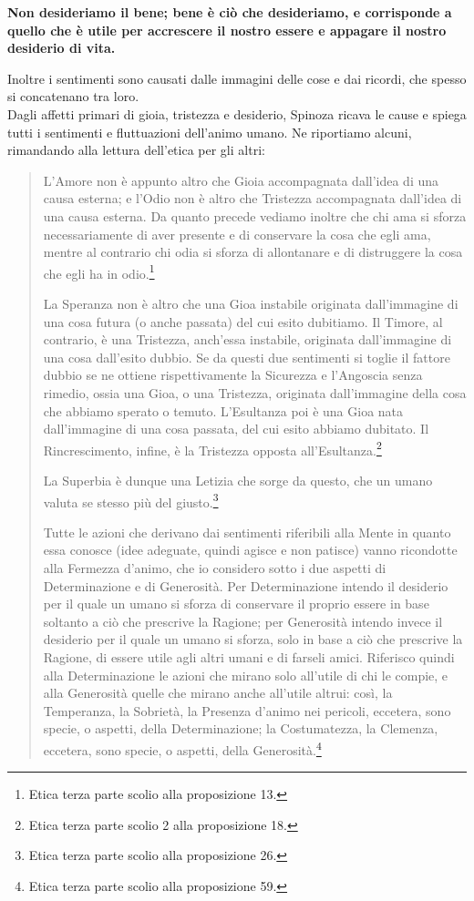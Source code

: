 \textbf{Non desideriamo il bene; bene è ciò che desideriamo, e corrisponde a quello che è utile per accrescere il nostro essere e appagare il nostro desiderio di vita.}

Inoltre i sentimenti sono causati dalle immagini delle cose e dai ricordi, che spesso si concatenano tra loro.\\
Dagli affetti primari di gioia, tristezza e desiderio, Spinoza ricava le cause e spiega tutti i sentimenti e fluttuazioni dell'animo umano. Ne riportiamo alcuni, rimandando alla lettura dell'etica per gli altri:

\begin{quotation}
	\small L’Amore non è appunto altro che Gioia accompagnata dall’idea di una causa
	esterna; e l’Odio non è altro che Tristezza accompagnata dall’idea di una causa esterna.
	Da quanto precede vediamo inoltre che chi ama si sforza necessariamente di aver presente
	e di conservare la cosa che egli ama, mentre al contrario chi odia si sforza di allontanare e
	di distruggere la cosa che egli ha in odio.\footnote{Etica terza parte scolio alla proposizione 13.}
	
	La Speranza non è altro che una Gioa instabile originata dall’immagine di una cosa futura (o anche passata) del cui esito dubitiamo. Il Timore, al contrario, è una Tristezza,
	anch’essa instabile, originata dall’immagine di una cosa dall’esito dubbio. Se da questi due
	sentimenti si toglie il fattore dubbio se ne ottiene rispettivamente la Sicurezza e l’Angoscia
	senza rimedio, ossia una Gioa, o una Tristezza, originata dall’immagine della cosa che
	abbiamo sperato o temuto. L'Esultanza poi è una Gioa nata dall’immagine di una cosa passata, del cui esito abbiamo dubitato. Il Rincrescimento, infine, è la Tristezza opposta all'Esultanza.\footnote{Etica terza parte scolio 2 alla proposizione 18.}
	
	La Superbia è dunque una Letizia
	che sorge da questo, che un umano valuta se stesso più del giusto.\footnote{Etica terza parte scolio alla proposizione 26.}
	
	Tutte le azioni che derivano dai sentimenti riferibili alla Mente in quanto
	essa conosce (idee adeguate, quindi agisce e non patisce) vanno ricondotte alla Fermezza d’animo, che io considero sotto i due aspetti di
	Determinazione e di Generosità. Per Determinazione intendo il desiderio per il quale un
	umano si sforza di conservare il proprio essere in base soltanto a ciò che prescrive la Ragione; per Generosità intendo invece il desiderio per il quale un umano si sforza, solo in base a ciò che prescrive la Ragione, di essere utile agli altri umani e di farseli amici. Riferisco quindi alla Determinazione le azioni che mirano solo all’utile di chi le compie, e alla
	Generosità quelle che mirano anche all’utile altrui: così, la Temperanza, la Sobrietà, la Presenza d’animo nei pericoli, eccetera, sono specie, o aspetti, della Determinazione; la Costumatezza, la Clemenza, eccetera, sono specie, o aspetti, della Generosità.\footnote{Etica terza parte scolio alla proposizione 59.}
	
\end{quotation}

